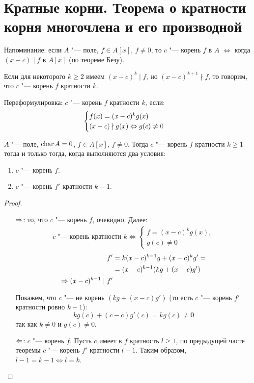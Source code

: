 ﻿\section{Кратные корни. Теорема о кратности корня многочлена и его производной}
Напоминание: если $A$ "--- поле, $f \in A[x]$, $f \neq 0$, то $c$ "--- корень $f$ в $A$ $\iff$ когда $(x - c) \mid f$ в $A[x]$ (по теореме Безу).

\begin{Def}
Если для некоторого $k \ge 2$ имеем $(x - c)^k \mid f$, но $(x - c)^{k + 1} \nmid f$, то говорим, что $c$ "--- корень $f$ кратности $k$.
\end{Def}

\begin{Rem}
Переформулировка: $c$ "--- корень $f$ кратности $k$, если:
\begin{gather*}
\begin{cases}
f(x) = (x - c)^{k}g(x) \\
(x - c) \nmid g(x) \Leftrightarrow g(c) \ne 0
\end{cases}
\end{gather*}
\end{Rem}

\begin{theorem}{}
$A$ "--- поле, $\operatorname{char} A = 0$, $f \in A[x]$, $f \ne 0$. Тогда $c$ "--- корень $f$ кратности $k \ge 1$ тогда и только тогда, когда
выполняются два условия:
\begin{enumerate}
\item $c$ "--- корень $f$.
\item $c$ "--- корень $f'$ кратности $k - 1$.
\end{enumerate}
\end{theorem}
\begin{proof}
\begin{itemize}
\item[$\Rightarrow$:] то, что $c$ "--- корень $f$, очевидно. Далее:
\begin{gather*}
\text{$c$ "--- корень кратности $k$} \iff
  \begin{cases}
  f = (x - c)^{k}g(x), \\
  g(c) \ne 0
  \end{cases}
\end{gather*}
\begin{align*}
f' &= k(x - c)^{k - 1}g + (x - c)^{k}g' = \\
   &= (x - c)^{k - 1}(kg + (x - c)g') \\
\Rightarrow (x - c)^{k - 1} \mid f' \\
\end{align*}

Покажем, что $c$ "--- не корень $(kg + (x - c)g')$ (то есть $c$ "--- корень $f'$ кратности ровно $k-1$):
\[kg(c) + (c - c)g'(c) = kg(c) \neq 0\]
так как $k\neq 0$ и $g(c) \neq 0$.

\item[$\Leftarrow$:]
$c$ "--- корень $f$. Пусть $c$ имеет в $f$ кратность $l \ge 1$, по предыдущей часте теоремы $c$ "--- корень $f'$ кратности $l - 1$.
Таким образом, $l-1=k-1 \iff l=k$.
\end{itemize}
\end{proof}

